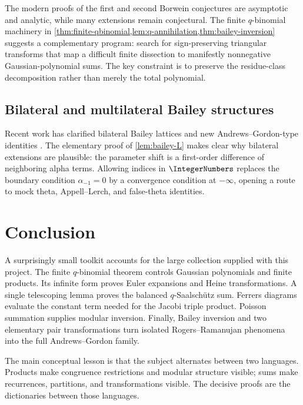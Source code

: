 \documentclass[11pt]{article}
\theoremstyle{blueplain}
\theoremstyle{bluedef}
\begin{document}
The modern proofs of the first and second Borwein conjectures are asymptotic and analytic, while many extensions remain conjectural.  The finite $q$-binomial machinery in \cref{thm:finite-qbinomial,lem:q-annihilation,thm:bailey-inversion} suggests a complementary program: search for sign-preserving triangular transforms that map a difficult finite dissection to manifestly nonnegative Gaussian-polynomial sums.  The key constraint is to preserve the residue-class decomposition rather than merely the total polynomial.

\subsection{Bilateral and multilateral Bailey structures}

Recent work has clarified bilateral Bailey lattices and new Andrews--Gordon-type identities \cite{DousseJouhetKonan2025,DousseJangJouhet2025}.  The elementary proof of \cref{lem:bailey-L} makes clear why bilateral extensions are plausible: the parameter shift is a first-order difference of neighboring alpha terms.  Allowing indices in $\IntegerNumbers$ replaces the boundary condition $\alpha_{-1}=0$ by a convergence condition at $-\infty$, opening a route to mock theta, Appell--Lerch, and false-theta identities.

\section{Conclusion}

A surprisingly small toolkit accounts for the large collection supplied with this project.  The finite $q$-binomial theorem controls Gaussian polynomials and finite products.  Its infinite form proves Euler expansions and Heine transformations.  A single telescoping lemma proves the balanced $q$-Saalsch\"utz sum.  Ferrers diagrams evaluate the constant term needed for the Jacobi triple product.  Poisson summation supplies modular inversion.  Finally, Bailey inversion and two elementary pair transformations turn isolated Rogers--Ramanujan phenomena into the full Andrews--Gordon family.

The main conceptual lesson is that the subject alternates between two languages.  Products make congruence restrictions and modular structure visible; sums make recurrences, partitions, and transformations visible.  The decisive proofs are the dictionaries between those languages.

\appendix
\end{document}
